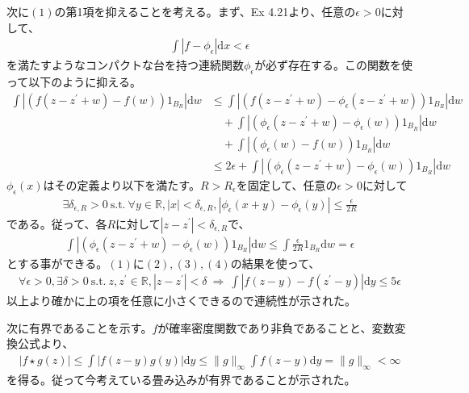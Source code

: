 \documentclass{article}
\begin{document}
次に$(1)$の第1項を抑えることを考える。まず、Ex 4.21より、任意の$\epsilon > 0$に対して、
\begin{align*}
	\int \left| f- \phi_{\epsilon} \right| \mathrm{d}x < \epsilon
\end{align*}
を満たすようなコンパクトな台を持つ連続関数$\phi_{\epsilon}$が必ず存在する。この関数を使って以下のように抑える。
\begin{align}
	\int \left| \left( f(z-z^{\prime}+w) - f(w)\right) 1_{B_R} \right| \mathrm{d}w &\leq \int \left| \left( f(z-z^{\prime} +w) - \phi_{\epsilon}(z-z^{\prime} +w) \right)1_{B_R} \right| \mathrm{d}w \nonumber \\&\quad +  \int \left| \left( \phi_{\epsilon}(z-z^{\prime} +w) - \phi_{\epsilon}(w) \right)1_{B_R} \right| \mathrm{d}w \nonumber \\ &\quad +  \int \left| \left( \phi_{\epsilon}(w) - f(w) \right)1_{B_R} \right| \mathrm{d}w \nonumber \\[8pt]
	&\leq 2\epsilon + \int \left| \left( \phi_{\epsilon}(z-z^{\prime} +w) - \phi_{\epsilon}(w) \right)1_{B_R} \right| \mathrm{d}w
\end{align}
$\phi_{\epsilon}(x)$はその定義より以下を満たす。$R > R_{\epsilon}$を固定して、任意の$\epsilon > 0$に対して
\begin{align*}
	\exists \delta_{\epsilon, R} > 0\ \text{s.t.}\ \forall y \in \mathbb{R}, \left| x \right| < \delta_{\epsilon, R}, \left| \phi_{\epsilon}(x + y)- \phi_{\epsilon}(y) \right| \leq \frac{\epsilon}{2R}
\end{align*}
である。従って、各$R$に対して$\left| z-z^{\prime} \right| < \delta_{\epsilon, R}$で、
\begin{align}
	\int \left| \left( \phi_{\epsilon}(z-z^{\prime} +w) - \phi_{\epsilon}(w) \right)1_{B_R} \right| \mathrm{d}w \leq \int \frac{\epsilon}{2R} 1_{B_R}\mathrm{d}w = \epsilon
\end{align}
とする事ができる。$(1)$に$(2),(3),(4)$の結果を使って、
\begin{align*}
	\forall \epsilon > 0, \exists \delta > 0\ \text{s.t.}\  z, z^{\prime} \in \mathbb{R}, \left| z-z^{\prime} \right| < \delta\ \Rightarrow\ \int \left| f(z-y) - f(z^{\prime} -y) \right| \mathrm{d}y \leq 5\epsilon
\end{align*}
以上より確かに上の項を任意に小さくできるので連続性が示された。

次に有界であることを示す。$f$が確率密度関数であり非負であることと、変数変換公式より、
\begin{align*}
	\left| f\star g(z) \right| \leq \int \left| f(z-y) g(y) \right| \mathrm{d}y \leq \| g \|_{\infty} \int f(z-y) \mathrm{d}y = \| g \|_{\infty} < \infty
\end{align*}
を得る。従って今考えている畳み込みが有界であることが示された。
\end{document}

